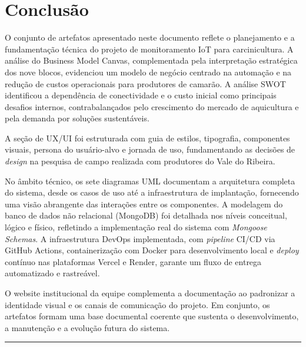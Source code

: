 \documentclass[11pt,a4paper]{article}
\begin{document}
\newpage
\section*{Conclusão}

O conjunto de artefatos apresentado neste documento reflete o planejamento e a fundamentação técnica do projeto de monitoramento IoT para carcinicultura. A análise do Business Model Canvas, complementada pela interpretação estratégica dos nove blocos, evidenciou um modelo de negócio centrado na automação e na redução de custos operacionais para produtores de camarão. A análise SWOT identificou a dependência de conectividade e o custo inicial como principais desafios internos, contrabalançados pelo crescimento do mercado de aquicultura e pela demanda por soluções sustentáveis.

A seção de UX/UI foi estruturada com guia de estilos, tipografia, componentes visuais, persona do usuário-alvo e jornada de uso, fundamentando as decisões de \textit{design} na pesquisa de campo realizada com produtores do Vale do Ribeira.

No âmbito técnico, os sete diagramas UML documentam a arquitetura completa do sistema, desde os casos de uso até a infraestrutura de implantação, fornecendo uma visão abrangente das interações entre os componentes. A modelagem do banco de dados não relacional (MongoDB) foi detalhada nos níveis conceitual, lógico e físico, refletindo a implementação real do sistema com \textit{Mongoose Schemas}. A infraestrutura DevOps implementada, com \textit{pipeline} CI/CD via GitHub Actions, containerização com Docker para desenvolvimento local e \textit{deploy} contínuo nas plataformas Vercel e Render, garante um fluxo de entrega automatizado e rastreável.

O website institucional da equipe complementa a documentação ao padronizar a identidade visual e os canais de comunicação do projeto. Em conjunto, os artefatos formam uma base documental coerente que sustenta o desenvolvimento, a manutenção e a evolução futura do sistema.

\vspace{1cm}
\noindent\rule{\textwidth}{0.5pt}
\vspace{0.3cm}

\newpage
{}

\end{document}
